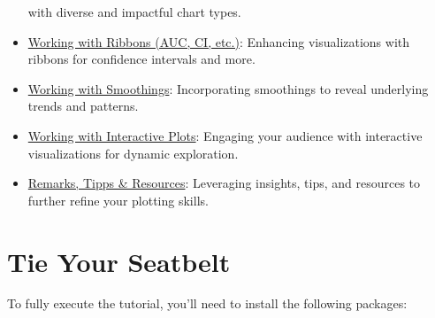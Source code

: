 \documentclass[
  letterpaper,
]{scrbook}
\begin{document}
\begin{itemize}
  with diverse and impactful chart types.
\item
  \hyperref[ribbons]{Working with Ribbons (AUC, CI, etc.)}: Enhancing
  visualizations with ribbons for confidence intervals and more.
\item
  \hyperref[smooths]{Working with Smoothings}: Incorporating smoothings
  to reveal underlying trends and patterns.
\item
  \hyperref[interactive]{Working with Interactive Plots}: Engaging your
  audience with interactive visualizations for dynamic exploration.
\item
  \hyperref[tipps]{Remarks, Tipps \& Resources}: Leveraging insights,
  tips, and resources to further refine your plotting skills.
\end{itemize}


\chapter{Tie Your Seatbelt}\label{prep}

To fully execute the tutorial, you'll need to install the following
packages:
\end{document}
